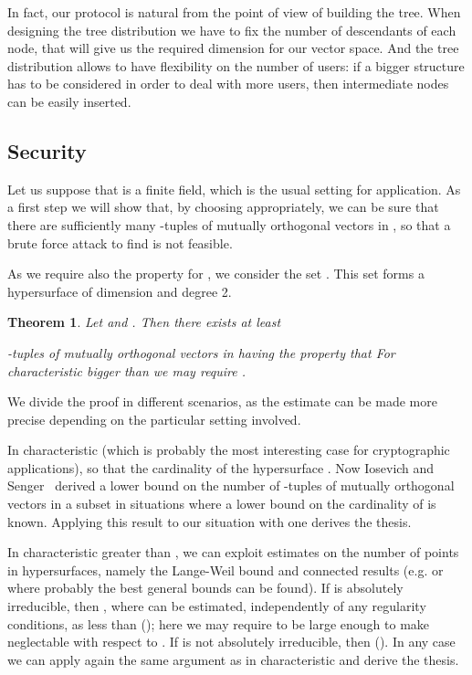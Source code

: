 \documentclass[a4paper,11pt]{amsart}
\newtheorem{theorem}{Theorem}
\theoremstyle{definition}
\begin{document}
In fact, our protocol is natural from the point of view of building
the tree. When designing the tree distribution we have to fix the
number of descendants of each node, that will give us the required
dimension for our vector space.  And the tree distribution allows to
have flexibility on the number of users: if a bigger structure has to
be considered in order to deal with more users, then intermediate
nodes can be easily inserted.





\subsection{Security}


Let us suppose that  is a finite field, which is the usual setting for application. As a first step we will show that, by choosing  appropriately, we
can be sure that there are sufficiently many -tuples of mutually
orthogonal vectors in , so that a brute force attack to find  is
not feasible.

As we require also the property  for
, we consider the set 
. This set forms a hypersurface  of
dimension  and degree 2.






\begin{theorem}
  Let  and
  . Then there exists at least

-tuples of mutually orthogonal vectors
 in  having the property that
 For characteristic bigger than  we may require .
\end{theorem}

We divide the proof in different scenarios, as the estimate can be
made more precise depending on the particular setting involved.

In characteristic  (which is probably the most interesting case for
cryptographic applications), 
so that the cardinality of the hypersurface .  Now
Iosevich and Senger~\cite{iosevich,vinh} derived a lower bound on the
number of -tuples of mutually orthogonal vectors in a subset
 in situations where a lower bound on the cardinality of
 is known. Applying this result to our situation with
 one derives the thesis.

In characteristic greater than , we can exploit estimates on the
number of points in hypersurfaces, namely the Lange-Weil bound and
connected results (e.g.\cite{cafure} or\cite{la14p} where probably the 
best general bounds can be found). If  is absolutely
irreducible, then , where  can be estimated,
independently of any regularity conditions, as less than  (\cite[Theorem 5.2]{cafure}); here we may require 
to be large enough to make  neglectable with respect to . If
 is not absolutely irreducible, then  (\cite[Lemma
2.3]{cafure}). In any case we can apply again the same argument as in
characteristic  and derive the thesis. 
\end{document}
